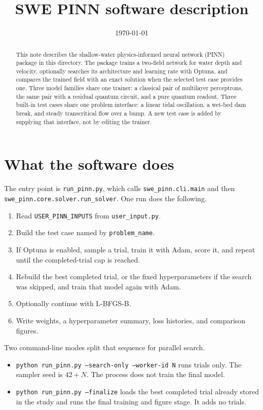 \documentclass[11pt]{article}
\title{SWE PINN software description}
\author{}
\date{\today}
\begin{document}
\maketitle

\begin{abstract}
This note describes the shallow-water physics-informed neural network (PINN) package in this directory.
The package trains a two-field network for water depth and velocity, optionally searches its architecture and learning rate with Optuna, and compares the trained field with an exact solution when the selected test case provides one.
Three model families share one trainer: a classical pair of multilayer perceptrons, the same pair with a residual quantum circuit, and a pure quantum readout.
Three built-in test cases share one problem interface: a linear tidal oscillation, a wet-bed dam break, and steady transcritical flow over a bump.
A new test case is added by supplying that interface, not by editing the trainer.
\end{abstract}

\section{What the software does}

The entry point is \texttt{run\_pinn.py}, which calls \texttt{swe\_pinn.cli.main} and then \texttt{swe\_pinn.core.solver.run\_solver}.
One run does the following.

\begin{enumerate}[leftmargin=1.4em]
\item Read \texttt{USER\_PINN\_INPUTS} from \texttt{user\_input.py}.
\item Build the test case named by \texttt{problem\_name}.
\item If Optuna is enabled, sample a trial, train it with Adam, score it, and repeat until the completed-trial cap is reached.
\item Rebuild the best completed trial, or the fixed hyperparameters if the search was skipped, and train that model again with Adam.
\item Optionally continue with L-BFGS-B.
\item Write weights, a hyperparameter summary, loss histories, and comparison figures.
\end{enumerate}

Two command-line modes split that sequence for parallel search.

\begin{itemize}[leftmargin=1.4em]
\item \texttt{python run\_pinn.py --search-only --worker-id N} runs trials only.
  The sampler seed is \(42+N\).
  The process does not train the final model.
\item \texttt{python run\_pinn.py --finalize} loads the best completed trial already stored in the study and runs the final training and figure stage.
  It adds no trials.
\end{itemize}
\end{document}
